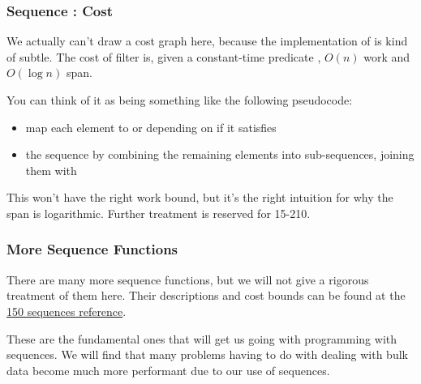 \documentclass[aspectratio=169]{beamer}
\newcommand{\fhex}[3][]{\node[hex, #1, fill=hexcolor, minimum width=0.4in] (#2) {#3}}
\begin{document}
\begin{frame}[fragile]
  \frametitle{Sequence : Cost}

  We actually can't draw a cost graph here, because the implementation of
   is kind of subtle. The cost of filter is, given a constant-time
  predicate , $O(n)$ work and $O(\log n)$ span.

  \pause
  \vspace{\fill}

  You can think of it as being something like the following pseudocode:

  \pause
  \begin{itemize}
    \item map each element to  or  depending on if it
    satisfies 
    \item {} the sequence by combining the remaining elements into
    sub-sequences, joining them with 
  \end{itemize}

  \pause
  \vspace{\fill}

  This won't have the right work bound, but it's the right intuition for
  why the span is logarithmic. Further treatment is reserved for 15-210.




\end{frame}

\begin{frame}[fragile]
  \frametitle{More Sequence Functions}

  There are many more sequence functions, but we will not give a rigorous
  treatment of them here. Their descriptions and cost bounds can be found
  at the
  {\color{blue}\href{http://www.cs.cmu.edu/~15150/resources/libraries/sequence.pdf}{150 sequences reference}}.

  \pause
  \vspace{\fill}

  These are the fundamental ones that will get us going with programming with
  sequences. We will find that many problems having to do with dealing with
  bulk data become much more performant due to our use of sequences.
\end{frame}
\end{document}

